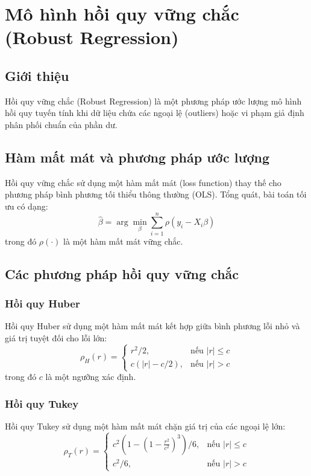 \chapter{Mô hình hồi quy vững chắc (Robust Regression)}
\section{Giới thiệu}
Hồi quy vững chắc (Robust Regression) là một phương pháp ước lượng mô hình hồi quy tuyến tính khi dữ liệu chứa các ngoại lệ (outliers) hoặc vi phạm giả định phân phối chuẩn của phần dư.

\section{Hàm mất mát và phương pháp ước lượng}
Hồi quy vững chắc sử dụng một hàm mất mát (loss function) thay thế cho phương pháp bình phương tối thiểu thông thường (OLS). Tổng quát, bài toán tối ưu có dạng:
\begin{equation}
    \hat{\beta} = \arg \min_{\beta} \sum_{i=1}^{n} \rho(y_i - X_i \beta)
\end{equation}
trong đó $\rho(\cdot)$ là một hàm mất mát vững chắc.

\section{Các phương pháp hồi quy vững chắc}
\subsection{Hồi quy Huber}
Hồi quy Huber sử dụng một hàm mất mát kết hợp giữa bình phương lỗi nhỏ và giá trị tuyệt đối cho lỗi lớn:
\begin{equation}
    \rho_H(r) = \begin{cases} r^2 / 2, & \text{nếu } |r| \leq c \\
    c(|r| - c/2), & \text{nếu } |r| > c \end{cases}
\end{equation}
trong đó $c$ là một ngưỡng xác định.

\subsection{Hồi quy Tukey}
Hồi quy Tukey sử dụng một hàm mất mát chặn giá trị của các ngoại lệ lớn:
\begin{equation}
    \rho_T(r) = \begin{cases} c^2 \left(1 - \left(1 - \frac{r^2}{c^2}\right)^3\right) / 6, & \text{nếu } |r| \leq c \\
    c^2 / 6, & \text{nếu } |r| > c \end{cases}
\end{equation}

